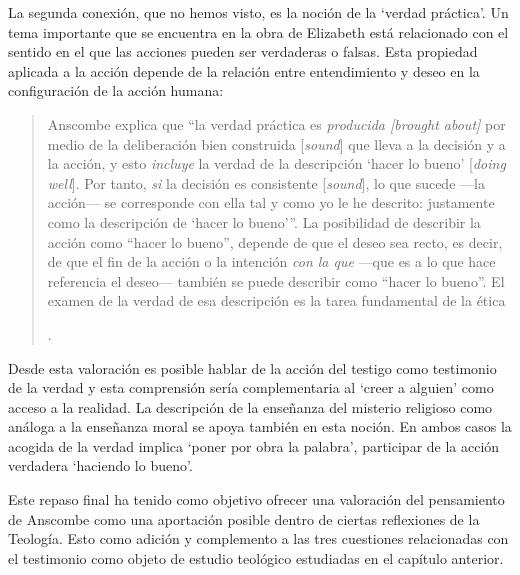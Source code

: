 La segunda conexión, que no hemos visto, es la noción de la `verdad práctica'. Un tema importante que se encuentra en la obra de Elizabeth está relacionado con el sentido en el que las acciones pueden ser verdaderas o falsas. Esta propiedad aplicada a la acción depende de la relación entre entendimiento y deseo en la configuración de la acción humana: \blockquote[{\Cite[189]{torralba2005accion}}.]{Anscombe explica que ``la verdad práctica es \emph{producida [brought about]} por medio de la deliberación bien construida [\emph{sound}] que lleva a la decisión y a la acción, y esto \emph{incluye} la verdad de la descripción `hacer lo bueno' [\emph{doing well}]. Por tanto, \emph{si} la decisión es consistente [\emph{sound}], lo que sucede ---la acción--- se corresponde con ella tal y como yo le he descrito: justamente como la descripción de `hacer lo bueno'''. La posibilidad de describir la acción como ``hacer lo bueno'', depende de que el deseo sea recto, es decir, de que el fin de la acción o la intención \emph{con la que} ---que es a lo que hace referencia el deseo--- también se puede describir como ``hacer lo bueno''. El examen de la verdad de esa descripción es la tarea fundamental de la ética}. Desde esta valoración es posible hablar de la acción del testigo como testimonio de la verdad y esta comprensión sería complementaria al `creer a alguien' como acceso a la realidad. La descripción de la enseñanza del misterio religioso como análoga a la enseñanza moral se apoya también en esta noción. En ambos casos la acogida de la verdad implica `poner por obra la palabra', participar de la acción verdadera `haciendo lo bueno'.

Este repaso final ha tenido como objetivo ofrecer una valoración del pensamiento de Anscombe como una aportación posible dentro de ciertas reflexiones de la Teología. Esto como adición y complemento a las tres cuestiones relacionadas con el testimonio como objeto de estudio teológico estudiadas en el capítulo anterior.

